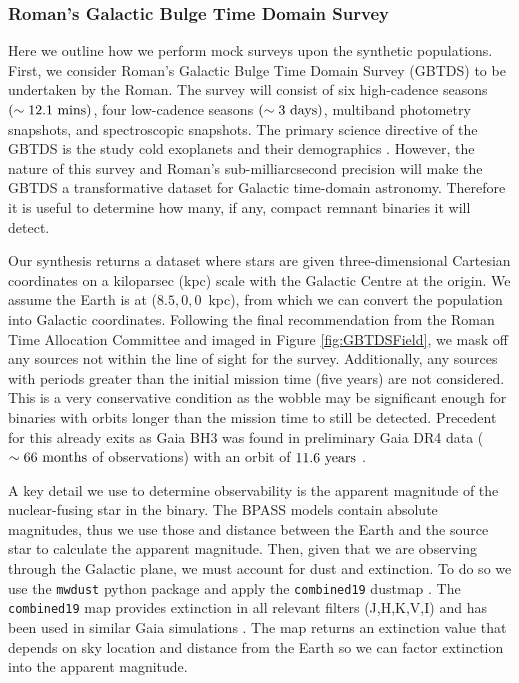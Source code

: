 \documentclass{pas}
\begin{document}
\subsubsection{Roman's Galactic Bulge Time Domain Survey}\label{mockGBTDS}

Here we outline how we perform mock surveys upon the synthetic populations. First, we consider Roman's Galactic Bulge Time Domain Survey (GBTDS) to be undertaken by the Roman. The survey will consist of six high-cadence seasons $(\sim12.1\ \rm{mins})$, four low-cadence seasons $(\sim3\ \rm{days})$, multiband photometry snapshots, and spectroscopic snapshots. The primary science directive of the GBTDS is the study cold exoplanets and their demographics \citep{committee2025romanobservationstimeallocation}. However, the nature of this survey and Roman's sub-milliarcsecond precision will make the GBTDS a transformative dataset for Galactic time-domain astronomy. Therefore it is useful to determine how many, if any, compact remnant binaries it will detect.

Our synthesis returns a dataset where stars are given three-dimensional Cartesian coordinates on a kiloparsec (kpc) scale with the Galactic Centre at the origin. We assume the Earth is at ($8.5,0,0$~kpc), from which we can convert the population into Galactic coordinates. Following the final recommendation from the Roman Time Allocation Committee \citep{committee2025romanobservationstimeallocation} and imaged in Figure \ref{fig:GBTDSField}, we mask off any sources not within the line of sight for the survey. Additionally, any sources with periods greater than the initial mission time (five years) are not considered. This is a very conservative condition as the wobble may be significant enough for binaries with orbits longer than the mission time to still be detected. Precedent for this already exits as Gaia BH3 was found in preliminary Gaia DR4 data ($\sim66~\rm{months}$ of observations) with an orbit of $11.6~\rm{years}$ \citep{BH3_2024}. 

A key detail we use to determine observability is the apparent magnitude of the nuclear-fusing star in the binary. The \textsc{BPASS} models contain absolute magnitudes, thus we use those and distance between the Earth and the source star to calculate the apparent magnitude. Then, given that we are observing through the Galactic plane, we must account for dust and extinction. To do so we use the \texttt{mwdust} python package and apply the \texttt{combined19} dustmap \citep{2016ApJ...818..130B}. The \texttt{combined19} map provides extinction in all relevant filters (J,H,K,V,I) and has been used in similar Gaia simulations \citep{Chawla_2022, 2025arXiv250821805C}. The map returns an extinction value that depends on sky location and distance from the Earth so we can factor extinction into the apparent magnitude. 
\end{document}
